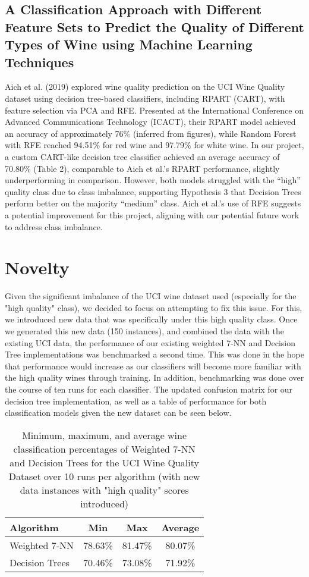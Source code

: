 \documentclass{article}
\theoremstyle{plain}
\theoremstyle{definition}
\theoremstyle{remark}
\begin{document}
\subsection{A Classification Approach with Different Feature Sets to Predict the Quality of
Different Types of Wine using Machine Learning Techniques}

Aich et al. (2019) explored wine quality prediction on the UCI Wine Quality dataset using decision tree-based classifiers, including RPART (CART), with feature selection via PCA and RFE. Presented at the International Conference on Advanced Communications Technology (ICACT), their RPART model achieved an accuracy of approximately 76\% (inferred from figures), while Random Forest with RFE reached 94.51\% for red wine and 97.79\% for white wine. In our project, a custom CART-like decision tree classifier achieved an average accuracy of 70.80\% (Table 2), comparable to Aich et al.’s RPART performance, slightly underperforming in comparison. However, both models struggled with the “high” quality class due to class imbalance, supporting Hypothesis 3 that Decision Trees perform better on the majority “medium” class. Aich et
al.’s use of RFE suggests a potential improvement for this project, aligning with our potential future work to address class imbalance.

\section{Novelty}

Given the significant imbalance of the UCI wine dataset used (especially for the "high quality" class), we decided to focus on attempting to fix this issue. For this, we introduced new data that was specifically under this high quality class. Once we generated this new data (150 instances), and combined the data with the existing UCI data, the performance of our existing weighted 7-NN and Decision Tree implementations was benchmarked a second time. This was done in the hope that performance would increase as our classifiers will become more familiar with the high quality wines through training. In addition, benchmarking was done over the course of ten runs for each classifier. The updated confusion matrix for our decision tree implementation, as well as a table of performance for both classification models given the new dataset can be seen below.

\begin{table}[H]
\centering
\begin{tabular}{lccc}
\toprule
Algorithm & Min & Max & Average \\
\midrule
Weighted 7-NN & 78.63\% & 81.47\% & 80.07\% \\
Decision Trees & 70.46\% & 73.08\% & 71.92\% \\
\bottomrule
\end{tabular}
\caption{Minimum, maximum, and average wine classification percentages of Weighted 7-NN and Decision Trees for the UCI Wine Quality Dataset over 10 runs per algorithm (with new data instances with "high quality" scores introduced)}
\end{table}
\end{document}
